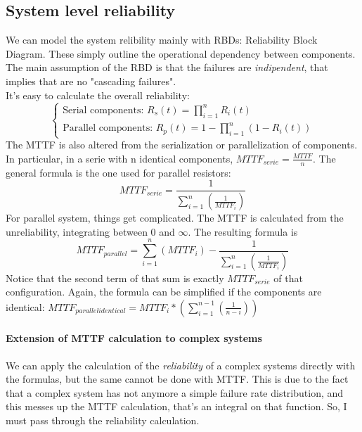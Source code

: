 \documentclass[10pt,a4paper]{article}
\begin{document}
			\subsection{System level reliability}
				We can model the system relibility mainly with RBDs: Reliability Block Diagram. These simply outline the operational dependency between components. The main assumption of the RBD is that the failures are \emph{indipendent}, that implies that are no "cascading failures".\\
				It's easy to calculate the overall reliability:
				\begin{equation}
					\begin{cases}
						\text{Serial components: } R_s(t) = \prod_{i=1}^{n}R_i(t)\\
						\text{Parallel components: } R_p(t) = 1 - \prod_{i=1}^{n} (1-R_i(t))
					\end{cases}
				\end{equation}
				The MTTF is also altered from the serialization or parallelization of components. In particular, in a serie with n identical components, $MTTF_{serie} = \frac{MTTF}{n}$. The general formula is the one used for parallel resistors:
				\begin{equation}
					MTTF_{serie} = \frac{1}{\sum_{i=1}^{n}(\frac{1}{MTTF_i})}
				\end{equation}
				For parallel system, things get complicated. The MTTF is calculated from the unreliability, integrating between 0 and $\infty$. The resulting formula is
				\begin{equation}
					MTTF_{parallel} = \sum_{i=1}^{n}(MTTF_i) - \frac{1}{\sum_{i=1}^{n}(\frac{1}{MTTF_i})}
				\end{equation}
				Notice that the second term of that sum is exactly $MTTF_{serie}$ of that configuration. Again, the formula can be simplified if the components are identical: $MTTF_{parallel identical} = MTTF_i*(\sum_{i=1}^{n-1}(\frac{1}{n-i}))$\\
				
				\paragraph{Extension of MTTF calculation to complex systems}
					We can apply the calculation of the \emph{reliability} of a complex systems directly with the formulas, but the same cannot be done with MTTF. This is due to the fact that a complex system has not anymore a simple failure rate distribution, and this messes up the MTTF calculation, that's an integral on that function. So, I must pass through the reliability calculation.
\end{document}
